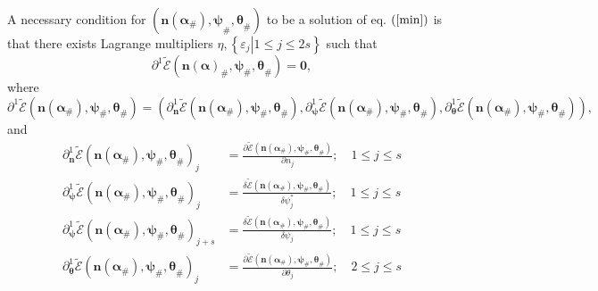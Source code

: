\documentclass[aps,preprint]{revtex4}%
\begin{document}
A necessary condition for $\left(  \mathbf{n\left(  \mathbf{\alpha}%
_{\#}\right)  ,\psi}_{\#}\mathbf{,\theta}_{\#}\right)  $ to be a solution of
eq. $\left(  \ref{min}\right)  $ is that there exists Lagrange multipliers
$\eta,\left\{  \left.  \varepsilon_{j}\right\vert 1\leq j\leq2s\right\}  $
such that
\begin{equation}
\partial^{1}\mathcal{\tilde{E}}\left(  \mathbf{n}\left(  \mathbf{\alpha
}\right)  _{\#}\mathbf{,\psi}_{\#}\mathbf{,\theta}_{\#}\right)  =\mathbf{0,}%
\end{equation}
where
\begin{equation}
\partial^{1}\mathcal{\tilde{E}}\left(  \mathbf{n}\left(  \mathbf{\alpha}%
_{\#}\right)  \mathbf{,\psi}_{\#}\mathbf{,\theta}_{\#}\right)  =\left(
\partial_{\mathbf{n}}^{1}\mathcal{\tilde{E}}\left(  \mathbf{n}\left(
\mathbf{\alpha}_{\#}\right)  \mathbf{,\psi}_{\#}\mathbf{,\theta}_{\#}\right)
,\partial_{\mathbf{\psi}}^{1}\mathcal{\tilde{E}}\left(  \mathbf{n}\left(
\mathbf{\alpha}_{\#}\right)  \mathbf{,\psi}_{\#}\mathbf{,\theta}_{\#}\right)
,\partial_{\mathbf{\theta}}^{1}\mathcal{\tilde{E}}\left(  \mathbf{n}\left(
\mathbf{\alpha}_{\#}\right)  \mathbf{,\psi}_{\#}\mathbf{,\theta}_{\#}\right)
\right)  ,
\end{equation}
and
\begin{align}
\partial_{\mathbf{n}}^{1}\mathcal{\tilde{E}}\left(  \mathbf{n}\left(
\mathbf{\alpha}_{\#}\right)  \mathbf{,\psi}_{\#}\mathbf{,\theta}_{\#}\right)
_{j}  &  =\frac{\partial\mathcal{\tilde{E}}\left(  \mathbf{n}\left(
\mathbf{\alpha}_{\#}\right)  \mathbf{,\psi}_{\#}\mathbf{,\theta}_{\#}\right)
}{\partial n_{j}};\quad1\leq j\leq s\nonumber\\
\partial_{\mathbf{\psi}}^{1}\mathcal{\tilde{E}}\left(  \mathbf{n}\left(
\mathbf{\alpha}_{\#}\right)  \mathbf{,\psi}_{\#}\mathbf{,\theta}_{\#}\right)
_{j}  &  =\frac{\delta\mathcal{\tilde{E}}\left(  \mathbf{n}\left(
\mathbf{\alpha}_{\#}\right)  \mathbf{,\psi}_{\#}\mathbf{,\theta}_{\#}\right)
}{\delta\psi_{j}^{\ast}};\quad1\leq j\leq s\nonumber\\
\partial_{\mathbf{\psi}}^{1}\mathcal{\tilde{E}}\left(  \mathbf{n}\left(
\mathbf{\alpha}_{\#}\right)  \mathbf{,\psi}_{\#}\mathbf{,\theta}_{\#}\right)
_{j+s}  &  =\frac{\delta\mathcal{\tilde{E}}\left(  \mathbf{n}\left(
\mathbf{\alpha}_{\#}\right)  \mathbf{,\psi}_{\#}\mathbf{,\theta}_{\#}\right)
}{\delta\psi_{j}};\quad1\leq j\leq s\nonumber\\
\partial_{\mathbf{\theta}}^{1}\mathcal{\tilde{E}}\left(  \mathbf{n}\left(
\mathbf{\alpha}_{\#}\right)  \mathbf{,\psi}_{\#}\mathbf{,\theta}_{\#}\right)
_{j}  &  =\frac{\partial\mathcal{\tilde{E}}\left(  \mathbf{n}\left(
\mathbf{\alpha}_{\#}\right)  \mathbf{,\psi}_{\#}\mathbf{,\theta}_{\#}\right)
}{\partial\theta_{j}};\quad2\leq j\leq s
\end{align}
\end{document}
